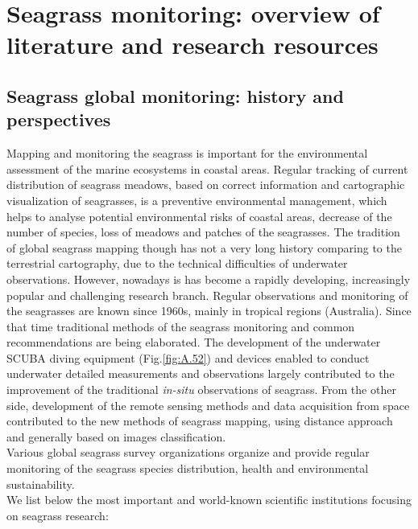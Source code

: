 \documentclass[11pt]{article}
\begin{document}
\section[Seagrass monitoring: overview of literature and research resources]{Seagrass monitoring: overview of literature and research resources} \label{sec:2}
\renewcommand{\headrulewidth}{0.4pt}

\subsection{Seagrass global monitoring: history and perspectives}
Mapping and monitoring the seagrass is important for the environmental assessment of the marine
ecosystems in coastal areas. Regular tracking of current distribution of seagrass meadows, based on
correct information and cartographic visualization of seagrasses, is a preventive environmental
management, which helps to analyse potential environmental risks of coastal areas, decrease of the
number of species, loss of meadows and patches of the seagrasses.
The tradition of global seagrass mapping though has not a very long history comparing to the
terrestrial cartography, due to the technical difficulties of underwater observations. However, nowadays is
has become a rapidly developing, increasingly popular and challenging research branch.\vspace{1ex}
Regular observations and monitoring of the seagrasses are known since 1960s, mainly in tropical
regions (Australia). Since that time traditional methods of the seagrass monitoring and common
recommendations are being elaborated. The development of the underwater \ac{SCUBA} diving
equipment (Fig.\ref{fig:A.52}) and devices enabled to conduct underwater detailed measurements and observations
largely contributed to the improvement of the traditional \textit{in-situ} observations of seagrass. From the
other side, development of the remote sensing methods and data acquisition from space contributed to
the new methods of seagrass mapping, using distance approach and generally based on images classification.\vspace{1ex}\\
Various global seagrass survey organizations  organize and provide regular monitoring of the seagrass species distribution, health and environmental sustainability. \\ We list below the most important and world-known scientific institutions focusing on seagrass research: 
\end{document}
